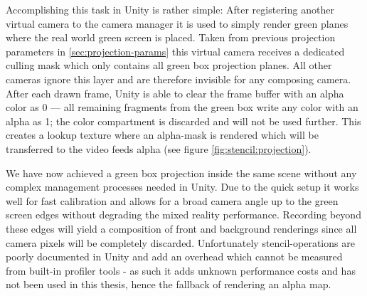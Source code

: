 Accomplishing this task in Unity is rather simple: After registering another 
virtual camera to the camera manager it is used to simply render green planes 
where the real world green screen is placed. Taken from previous projection 
parameters in \ref{sec:projection-params} this virtual camera receives a 
dedicated culling mask which only contains all green box projection planes. All 
other cameras ignore this layer and are therefore invisible for any composing 
camera. After each drawn frame, Unity is able to clear the frame buffer with an 
alpha color as 0 --- all remaining fragments from the green box write any color 
with an alpha as 1; the color compartment is discarded and will not be used 
further. This creates a lookup texture where an alpha-mask is rendered which 
will be transferred to the video feeds alpha (see figure 
\ref{fig:stencil:projection}).

We have now achieved a green box projection inside the same scene without any 
complex management processes needed in Unity. Due to the quick setup it works 
well for fast calibration and allows for a broad camera angle up to the green 
screen edges without degrading the mixed reality performance. Recording beyond 
these edges will yield a composition of front and background renderings 
since all camera pixels will be completely discarded.
\newline
Unfortunately stencil-operations are poorly documented in Unity and add an 
overhead which cannot be measured from built-in profiler tools - as such it 
adds unknown performance costs and has not been used in this thesis, hence the 
fallback of rendering an alpha map.